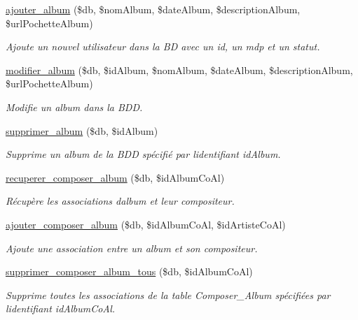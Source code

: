 \begin{DoxyCompactItemize}
\hyperlink{fonctionAlbum_8php_ac2453faf6d0805d8cb4afe186969393c}{ajouter\+\_\+album} (\$db, \$nom\+Album, \$date\+Album, \$description\+Album, \$url\+Pochette\+Album)
\begin{DoxyCompactList}\small\item\em Ajoute un nouvel utilisateur dans la BD avec un id, un mdp et un statut. \end{DoxyCompactList}\item 
\hyperlink{fonctionAlbum_8php_a056b76796cfed706c16ff9ed42dc5086}{modifier\+\_\+album} (\$db, \$id\+Album, \$nom\+Album, \$date\+Album, \$description\+Album, \$url\+Pochette\+Album)
\begin{DoxyCompactList}\small\item\em Modifie un album dans la B\+DD. \end{DoxyCompactList}\item 
\hyperlink{fonctionAlbum_8php_af82f3b33c72efc21b92271e6ab963c2f}{supprimer\+\_\+album} (\$db, \$id\+Album)
\begin{DoxyCompactList}\small\item\em Supprime un album de la B\+DD spécifié par l\textquotesingle{}identifiant \textquotesingle{}id\+Album\textquotesingle{}. \end{DoxyCompactList}\item 
\hyperlink{fonctionAlbum_8php_a866279ca688d1934eeb3e3d722c88881}{recuperer\+\_\+composer\+\_\+album} (\$db, \$id\+Album\+Co\+Al)
\begin{DoxyCompactList}\small\item\em Récupère les associations d\textquotesingle{}album et leur compositeur. \end{DoxyCompactList}\item 
\hyperlink{fonctionAlbum_8php_ad698da0173b76c53734478a97eca1d08}{ajouter\+\_\+composer\+\_\+album} (\$db, \$id\+Album\+Co\+Al, \$id\+Artiste\+Co\+Al)
\begin{DoxyCompactList}\small\item\em Ajoute une association entre un album et son compositeur. \end{DoxyCompactList}\item 
\hyperlink{fonctionAlbum_8php_a66de9b2d7b8761ef7476d05bec575b83}{supprimer\+\_\+composer\+\_\+album\+\_\+tous} (\$db, \$id\+Album\+Co\+Al)
\begin{DoxyCompactList}\small\item\em Supprime toutes les associations de la table Composer\+\_\+\+Album spécifiées par l\textquotesingle{}identifiant \textquotesingle{}id\+Album\+Co\+Al\textquotesingle{}. \end{DoxyCompactList}\item 

\end{DoxyCompactItemize}
